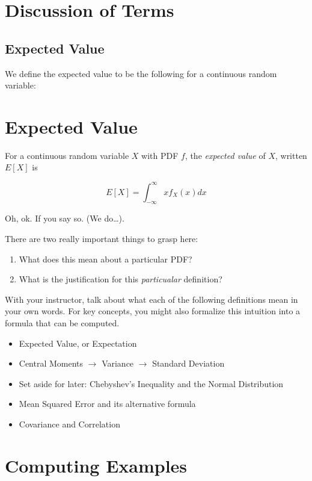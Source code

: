 \documentclass[
  letterpaper,
  DIV=11,
  numbers=noendperiod]{scrreprt}
\providecommand{\tightlist}{%
  \setlength{\itemsep}{0pt}\setlength{\parskip}{0pt}}\usepackage{longtable,booktabs,array}
\begin{document}
\section{Discussion of Terms}\label{discussion-of-terms}

\subsection{Expected Value}\label{expected-value}

We define the expected value to be the following for a continuous random
variable:

\section{Expected Value}\label{expected-value-1}

For a continuous random variable \(X\) with PDF \(f\), the
\emph{expected value} of \(X\), written \(E[X]\) is

\[
E[X] = \int_{-\infty}^{\infty}xf_{X}(x) dx
\]

Oh, ok. If you say so. (We do\ldots).

There are two really important things to grasp here:

\begin{enumerate}
\def\labelenumi{\arabic{enumi}.}
\tightlist
\item
  What does this mean about a particular PDF?
\item
  What is the justification for this \emph{particualar} definition?
\end{enumerate}

With your instructor, talk about what each of the following definitions
mean in your own words. For key concepts, you might also formalize this
intuition into a formula that can be computed.

\begin{itemize}
\tightlist
\item
  Expected Value, or Expectation
\item
  Central Moments \(\rightarrow\) Variance \(\rightarrow\) Standard
  Deviation
\item
  Set aside for later: Chebyshev's Inequality and the Normal
  Distribution
\item
  Mean Squared Error and its alternative formula
\item
  Covariance and Correlation
\end{itemize}

\section{Computing Examples}\label{computing-examples}
\end{document}
